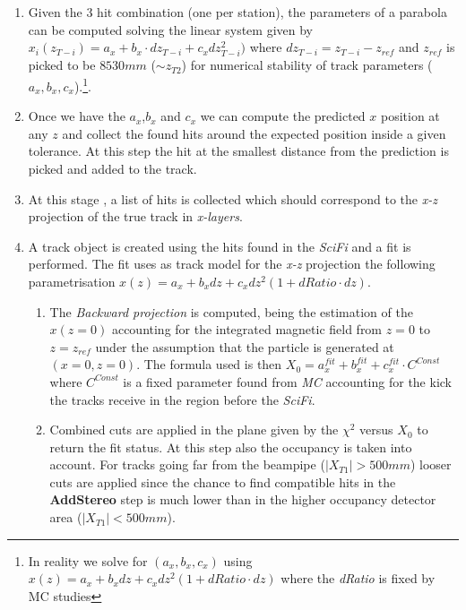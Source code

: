 \documentclass[paper=a4, fontsize=10pt]{scrartcl}
\numberwithin{equation}{section}		%
\numberwithin{figure}{section}			%
\numberwithin{table}{section}				%
\begin{document}
\begin{itemize}
\begin{itemize}
{\begin{enumerate}
  \item{Given the 3 hit combination (one per station), the parameters of a parabola can be computed solving the linear system given by $x_{i}(z_{T-i})= a_{x}+b_{x}\cdot dz_{T-i}+c_{x}dz_{T-i}^{2})$ where $dz_{T-i} = z_{T-i}-z_{ref}$ and $z_{ref}$ is picked to be $8530 mm$ ($\sim z_{T2}$) for numerical stability of track parameters ($a_{x},b_{x},c_{x}$).\footnote{In reality we solve for $(a_{x},b_{x},c_{x})$ using $x(z)=a_{x}+b_{x}dz+c_{x}dz^{2}(1+dRatio\cdot dz)$ where the \textit{dRatio} is fixed by MC studies}}.
  \item{Once we have the $a_{x}$,$b_{x}$ and $c_{x}$ we can compute the predicted $x$ position at any $z$ and collect the found hits around the expected position inside a given tolerance. At this step the hit at the smallest distance from the prediction is picked and added to the track.}
  \item{At this stage , a list of hits is collected which should correspond to the \textit{x-z} projection of the true track in \textit{x-layers}.}
  \item{A track object is created using the hits found in the \textit{SciFi} and a fit is performed. The fit uses as track model for the \textit{x-z} projection the following parametrisation $x(z)=a_{x}+b_{x}dz+c_{x}dz^{2}(1+dRatio\cdot dz)$.}
    \begin{enumerate}
    \item{The \textit{Backward projection} is computed, being the estimation of the $x(z=0)$ accounting for the integrated magnetic field from $z=0$ to $z=z_{ref}$ under the assumption that the particle is generated at $(x=0,z=0)$. The formula used is then $X_{0} = a^{fit}_{x}+b^{fit}_{x}+c^{fit}_{x} \cdot C^{Const}$ where $C^{Const}$ is a fixed parameter found from \textit{MC} accounting for the kick the tracks receive in the region before the \textit{SciFi}. }
    \item{Combined cuts are applied in the plane given by the $\chi^{2}$ versus $X_{0}$ to return the fit status. At this step also the occupancy is taken into account. For tracks going far from the beampipe ($\left| X_{T1} \right| > 500 mm$) looser cuts are applied since the chance to find compatible hits in the \textbf{AddStereo} step is much lower than in the higher occupancy detector area ($\left| X_{T1} \right| <500 mm$).}

\end{enumerate}
\end{enumerate}}
\end{itemize}
\end{itemize}
\end{document}
